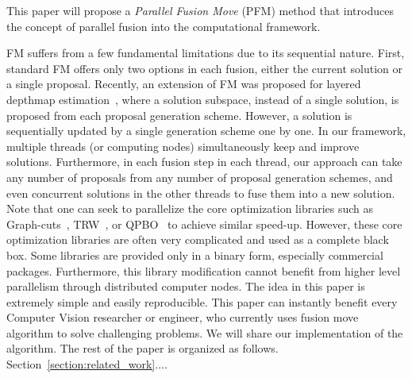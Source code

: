 %
This paper will propose a {\it Parallel Fusion Move} (PFM) method that
introduces the concept of parallel fusion into the computational
framework.

FM suffers from a few fundamental limitations due to its sequential
nature. First, standard FM offers only two options in each fusion,
either the current solution or a single proposal. Recently, an extension
of FM was proposed for layered depthmap estimation~\cite{chen_2016},
where a solution subspace, instead of a single solution, is proposed
from each proposal generation scheme. However, a solution is
sequentially updated by a single generation scheme one by one. In our
framework, multiple threads (or computing nodes) simultaneously keep and
improve solutions. Furthermore, in each fusion step in each thread, our
approach can take any number of proposals from any number of proposal
generation schemes, and even concurrent solutions in the other threads
to fuse them into a new solution.
%
Note that one can seek to parallelize the core optimization libraries
such as Graph-cuts~\cite{}, TRW~\cite{kolmogorov}, or QPBO~\cite{} to
achieve similar speed-up. However, these core optimization libraries are
often very complicated and used as a complete black box. Some libraries
are provided only in a binary form, especially commercial
packages. Furthermore, this library modification cannot benefit from
higher level parallelism through distributed computer nodes.
%
The idea in this paper is extremely simple and easily reproducible. This
paper can instantly benefit every Computer Vision researcher or
engineer, who currently uses fusion move algorithm to solve challenging
problems. We will share our implementation of the algorithm. The rest of
the paper is organized as follows. Section~\ref{section:related_work}....
%

